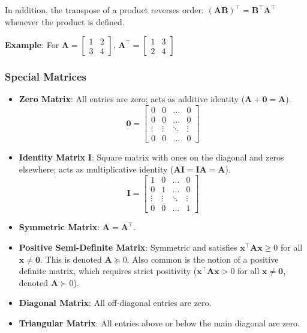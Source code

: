 In addition, the transpose of a product reverses order: $(\mathbf{A}\mathbf{B})^\top = \mathbf{B}^\top \mathbf{A}^\top$ whenever the product is defined.

\begin{exampleBox}
    \textbf{Example}: For $ \mathbf{A} = \begin{bmatrix}1 & 2\\3 & 4\end{bmatrix} $, $ \mathbf{A}^\top = \begin{bmatrix}1 & 3\\2 & 4\end{bmatrix} $
\end{exampleBox}

\subsubsection{Special Matrices}
\begin{itemize}
    \item \textbf{Zero Matrix}: All entries are zero; acts as additive identity ($ \mathbf{A} + \mathbf{0} = \mathbf{A} $).
    \begin{equation*}
        \mathbf{0} = \begin{bmatrix}0 & 0 & \ldots & 0\\0 & 0 & \ldots & 0\\ \vdots & \vdots & \ddots & \vdots\\0 & 0 & \ldots & 0\end{bmatrix}
    \end{equation*}
    \item \textbf{Identity Matrix} $ \mathbf{I} $: Square matrix with ones on the diagonal and zeros elsewhere; acts as multiplicative identity ($ \mathbf{A}\mathbf{I} = \mathbf{I}\mathbf{A} = \mathbf{A} $).
    \begin{equation*}
        \mathbf{I} = \begin{bmatrix}1 & 0 & \ldots & 0\\0 & 1 & \ldots & 0\\ \vdots & \vdots & \ddots & \vdots\\0 & 0 & \ldots & 1\end{bmatrix}
    \end{equation*}
    \item \textbf{Symmetric Matrix}: $ \mathbf{A} = \mathbf{A}^\top $.
    \item \textbf{Positive Semi-Definite Matrix}: Symmetric and satisfies $ \mathbf{x}^\top \mathbf{A} \mathbf{x} \geq 0 $ for all $ \mathbf{x} \neq \mathbf{0} $. This is denoted $ \mathbf{A} \succeq 0 $. Also common is the notion of a positive definite matrix, which requires strict positivity ($ \mathbf{x}^\top \mathbf{A} \mathbf{x} > 0 $ for all $ \mathbf{x} \neq \mathbf{0} $, denoted $ \mathbf{A} \succ 0 $).
    \item \textbf{Diagonal Matrix}: All off-diagonal entries are zero.
    \item \textbf{Triangular Matrix}: All entries above or below the main diagonal are zero.
\end{itemize}

